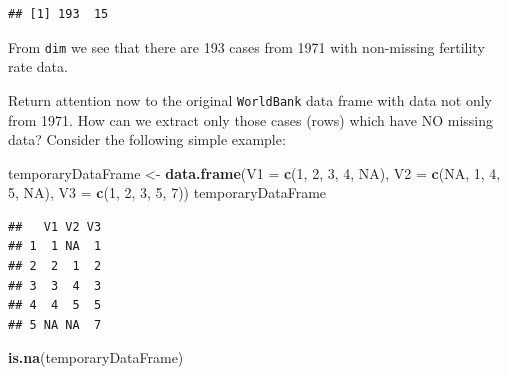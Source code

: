 \documentclass[
]{krantz}
\newenvironment{Shaded}{\begin{snugshade}}{\end{snugshade}}
\newcommand{\DataTypeTok}[1]{\textcolor[rgb]{0.13,0.29,0.53}{#1}}
\newcommand{\DecValTok}[1]{\textcolor[rgb]{0.00,0.00,0.81}{#1}}
\newcommand{\KeywordTok}[1]{\textcolor[rgb]{0.13,0.29,0.53}{\textbf{#1}}}
\newcommand{\NormalTok}[1]{#1}
\newcommand{\OperatorTok}[1]{\textcolor[rgb]{0.81,0.36,0.00}{\textbf{#1}}}
\newcommand{\OtherTok}[1]{\textcolor[rgb]{0.56,0.35,0.01}{#1}}
\newcommand{\StringTok}[1]{\textcolor[rgb]{0.31,0.60,0.02}{#1}}
\begin{document}
\begin{Shaded}
\end{Shaded}

\begin{verbatim}
## [1] 193  15
\end{verbatim}

From \texttt{dim} we see that there are 193 cases from 1971 with non-missing fertility rate data.

Return attention now to the original \texttt{WorldBank} data frame with data not only from 1971. How can we extract only those cases (rows) which have NO missing data? Consider the following simple example:

\begin{Shaded}
\begin{Highlighting}[]
\NormalTok{temporaryDataFrame \textless{}{-}}\StringTok{ }\KeywordTok{data.frame}\NormalTok{(}\DataTypeTok{V1 =} \KeywordTok{c}\NormalTok{(}\DecValTok{1}\NormalTok{, }\DecValTok{2}\NormalTok{, }\DecValTok{3}\NormalTok{, }\DecValTok{4}\NormalTok{, }\OtherTok{NA}\NormalTok{),}
                                 \DataTypeTok{V2 =} \KeywordTok{c}\NormalTok{(}\OtherTok{NA}\NormalTok{, }\DecValTok{1}\NormalTok{, }\DecValTok{4}\NormalTok{, }\DecValTok{5}\NormalTok{, }\OtherTok{NA}\NormalTok{),}
                                 \DataTypeTok{V3 =} \KeywordTok{c}\NormalTok{(}\DecValTok{1}\NormalTok{, }\DecValTok{2}\NormalTok{, }\DecValTok{3}\NormalTok{, }\DecValTok{5}\NormalTok{, }\DecValTok{7}\NormalTok{))}
\NormalTok{temporaryDataFrame}
\end{Highlighting}
\end{Shaded}

\begin{verbatim}
##   V1 V2 V3
## 1  1 NA  1
## 2  2  1  2
## 3  3  4  3
## 4  4  5  5
## 5 NA NA  7
\end{verbatim}

\begin{Shaded}
\begin{Highlighting}[]
\KeywordTok{is.na}\NormalTok{(temporaryDataFrame)}
\end{Highlighting}
\end{Shaded}
\end{document}
